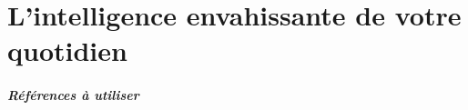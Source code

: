 \chapter{L'intelligence envahissante de votre quotidien}

\paragraph{Références à utiliser}
\cite{GhostInTheShell}
\cite{Moore0}
\cite{ProgrammableCity0}
\cite{ProgrammableCity1}
\cite{PsychoPass}
\cite{University1}



 